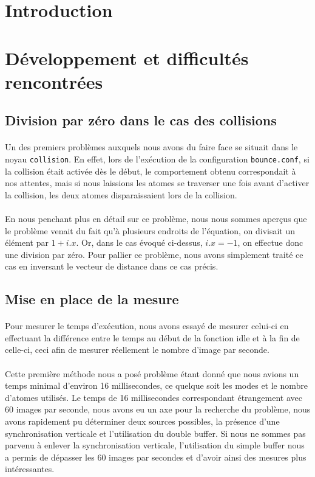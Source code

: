 \documentclass{article}
\begin{document}
\section{Introduction}

\section{Développement et difficultés rencontrées}

\subsection{Division par zéro dans le cas des collisions}

\paragraph{}
Un des premiers problèmes auxquels nous avons du faire face se situait dans le
noyau \verb!collision!. En effet, lors de l'exécution de la configuration
\verb!bounce.conf!, si la collision était activée dès le début, le
comportement obtenu correspondait à nos attentes, mais si nous laissions les
atomes se traverser une fois avant d'activer la collision, les deux atomes
disparaissaient lors de la collision.

\paragraph{}
En nous penchant plus en détail sur ce problème, nous nous sommes aperçus que le
problème venait du fait qu'à plusieurs endroits de l'équation, on divisait un
élément par $1 + i.x$. Or, dans le cas évoqué ci-dessus, $i.x = -1$, on effectue
donc une division par zéro. Pour pallier ce problème, nous avons simplement
traité ce cas en inversant le vecteur de distance dans ce cas précis.

\subsection{Mise en place de la mesure}
\paragraph{}
Pour mesurer le temps d'exécution, nous avons essayé de mesurer celui-ci en
effectuant la différence entre le temps au début de la fonction idle et à la
fin de celle-ci, ceci afin de mesurer réellement le nombre d'image par seconde.
\paragraph{}
Cette première méthode nous a posé problème étant donné que nous avions un temps
minimal d'environ 16 millisecondes, ce quelque soit les modes et le nombre
d'atomes utilisés. Le temps de 16 millisecondes correspondant étrangement avec
60 images par seconde, nous avons eu un axe pour la recherche du problème, nous
avons rapidement pu déterminer deux sources possibles, la présence d'une
synchronisation verticale et l'utilisation du double buffer. Si nous ne sommes
pas parvenu à enlever la synchronisation verticale, l'utilisation du simple
buffer nous a permis de dépasser les 60 images par secondes et d'avoir ainsi des
mesures plus intéressantes.
\end{document}
